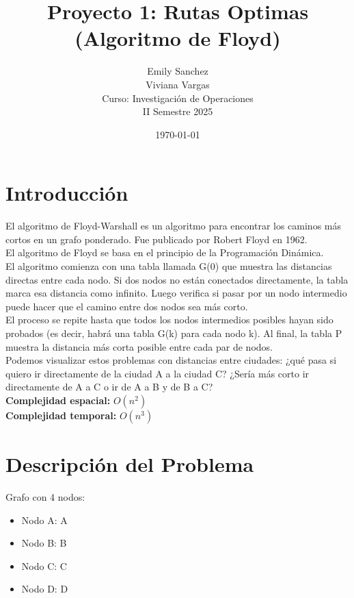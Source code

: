 \documentclass[12pt]{article}
\title{Proyecto 1: Rutas Optimas (Algoritmo de Floyd)}
\author{Emily Sanchez \\ Viviana Vargas \\[1cm] Curso: Investigación de Operaciones \\ II Semestre 2025}
\date{\today}
\begin{document}
\maketitle
\thispagestyle{empty}
\newpage
\setcounter{page}{1}

\section{Introducción}
El algoritmo de Floyd-Warshall es un algoritmo para encontrar los caminos más cortos en un grafo ponderado. Fue publicado por Robert Floyd en 1962.\\
El algoritmo de Floyd se basa en el principio de la Programación Dinámica.\\
El algoritmo comienza con una tabla llamada G(0) que muestra las distancias directas entre cada nodo. Si dos nodos no están conectados directamente, la tabla marca esa distancia como infinito. Luego verifica si pasar por un nodo intermedio puede hacer que el camino entre dos nodos sea más corto.\\
El proceso se repite hasta que todos los nodos intermedios posibles hayan sido probados (es decir, habrá una tabla G(k) para cada nodo k). Al final, la tabla P muestra la distancia más corta posible entre cada par de nodos.\\
Podemos visualizar estos problemas con distancias entre ciudades: ¿qué pasa si quiero ir directamente de la ciudad A a la ciudad C? ¿Sería más corto ir directamente de A a C o ir de A a B y de B a C?\\
\textbf{Complejidad espacial:} $O(n^2)$\\
\textbf{Complejidad temporal:} $O(n^3)$\\
\clearpage
\section{Descripción del Problema}
Grafo con 4 nodos:

\begin{itemize}
\item Nodo A: A
\item Nodo B: B
\item Nodo C: C
\item Nodo D: D
\end{itemize}
\end{document}
